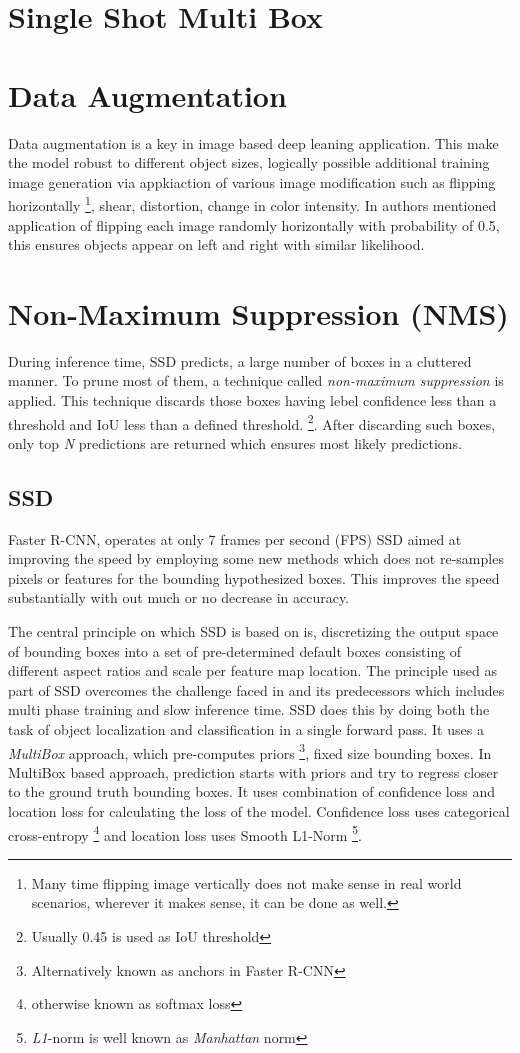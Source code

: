 \section{Single Shot Multi Box}
\section{Data Augmentation}
Data augmentation  is a key in image based deep leaning application. This make the model robust to different object sizes, logically possible  additional training image generation via appkiaction of various image modification such as flipping horizontally \footnote{Many time flipping image vertically does not make sense in real world scenarios, wherever it makes sense, it can be done as well.}, shear, distortion, change in color intensity. In \cite{liu2016ssd} authors mentioned application of flipping each image randomly horizontally with probability of 0.5, this ensures objects appear on left and right with similar likelihood.

\section{Non-Maximum Suppression (NMS)}
During inference time, SSD predicts, a large number of boxes in a cluttered manner. To prune most of them, a technique called \textit{non-maximum suppression} is applied. This technique discards those boxes having lebel confidence less than a threshold and IoU less than a defined threshold. \footnote{Usually 0.45 is used as IoU threshold}. After discarding such boxes, only top \textit{N} predictions are returned which ensures most likely predictions.
\subsection{SSD}
Faster R-CNN, operates at only 7 frames per second (FPS) SSD aimed at improving the speed by employing some new methods which does not re-samples pixels or features for the bounding hypothesized boxes. This improves the speed substantially with out much or no decrease in accuracy. 

\newpara The central principle on which SSD \cite{liu2016ssd} is based on is, discretizing the output space of bounding boxes into a set of pre-determined default boxes consisting of different aspect ratios and scale per feature map location. The principle used as part of SSD overcomes the challenge faced in \cite{ren2015faster} and its predecessors which includes multi phase training and slow inference time. SSD does this by doing both the task of object localization and classification in a single forward pass. It uses a \textit{MultiBox} approach, which pre-computes priors \footnote{Alternatively known as anchors in Faster R-CNN}, fixed size bounding boxes. In MultiBox based approach, prediction starts with priors and try to regress closer to the ground truth bounding boxes.
It uses combination of confidence loss and location loss for calculating the loss of the model. Confidence loss uses categorical cross-entropy \footnote{otherwise known as softmax loss} and location loss uses Smooth L1-Norm \footnote{\textit{L1}-norm is well known as \textit{Manhattan }norm}.

